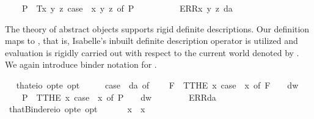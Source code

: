 \begin{isabellebody}
\ \ \ \ P{\isacharparenleft}{\isacharunderscore}{\isacharparenright}\ {\isasymRightarrow}\ T{\isacharparenleft}{\isasymlambda}x\ y\ z{\isachardot}\ case\ {\isacharparenleft}{\isasymPhi}\ x\ y\ z{\isacharparenright}\ of\ P{\isacharparenleft}{\isasymphi}{\isacharparenright}\ {\isasymRightarrow}\ {\isasymphi}{\isacharparenright}\ {\isacharbar}\ \isanewline
\ \ \ \ {\isacharunderscore}\ {\isasymRightarrow}\ ERR{\isacharparenleft}{\isasymlambda}x\ y\ z{\isachardot}\ da{\isacharparenright}{\isachardoublequoteclose}%
\begin{isamarkuptext}%
The theory of abstract objects supports rigid definite descriptions. Our definition maps
   to , that is, Isabelle's inbuilt definite description operator 
  is utilized and evaluation is rigidly carried out with respect to the current world denoted by .
  We again introduce binder notation for \isa{\isactrlbold {\isasymiota}}.%
\end{isamarkuptext}\isamarkuptrue%
\ \isamarkupfalse%
\ that{\isacharcolon}{\isacharcolon}{\isachardoublequoteopen}{\isacharparenleft}e{\isasymRightarrow}io\ opt{\isacharparenright}{\isasymRightarrow}e\ opt{\isachardoublequoteclose}\ {\isacharparenleft}{\isachardoublequoteopen}\isactrlbold {\isasymiota}{\isachardoublequoteclose}{\isacharparenright}\ \ \ {\isachardoublequoteopen}\isactrlbold {\isasymiota}{\isasymPhi}\ {\isasymequiv}\ case\ {\isacharparenleft}{\isasymPhi}\ da{\isacharparenright}\ of\isanewline
\ \ \ \ F{\isacharparenleft}{\isacharunderscore}{\isacharparenright}\ {\isasymRightarrow}\ T{\isacharparenleft}THE\ x{\isachardot}\ case\ {\isacharparenleft}{\isasymPhi}\ x{\isacharparenright}\ of\ F\ {\isasympsi}\ {\isasymRightarrow}\ {\isasympsi}\ dw{\isacharparenright}\ {\isacharbar}\ \isanewline
\ \ \ \ P{\isacharparenleft}{\isacharunderscore}{\isacharparenright}\ {\isasymRightarrow}\ T{\isacharparenleft}THE\ x{\isachardot}\ case\ {\isacharparenleft}{\isasymPhi}\ x{\isacharparenright}\ of\ P\ {\isasympsi}\ {\isasymRightarrow}\ {\isasympsi}\ dw{\isacharparenright}\ {\isacharbar}\ \isanewline
\ \ \ \ {\isacharunderscore}\ {\isasymRightarrow}\ ERR{\isacharparenleft}da{\isacharparenright}{\isachardoublequoteclose}\isanewline
\ \isamarkupfalse%
\ thatBinder{\isacharcolon}{\isacharcolon}{\isachardoublequoteopen}{\isacharparenleft}e{\isasymRightarrow}io\ opt{\isacharparenright}{\isasymRightarrow}e\ opt{\isachardoublequoteclose}\ {\isacharparenleft}\ {\isachardoublequoteopen}\isactrlbold {\isasymiota}{\isachardoublequoteclose}\ {\isacharbrackleft}{}{\isacharbrackright}\ {}{\isacharparenright}\ \ \ {\isachardoublequoteopen}\isactrlbold {\isasymiota}x{\isachardot}\ {\isasymphi}\ x\ {\isasymequiv}\ \isactrlbold {\isasymiota}\ {\isasymphi}{\isachardoublequoteclose}%

\end{isabellebody}

